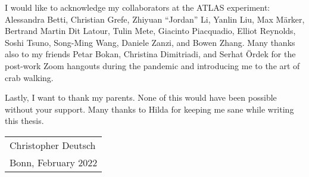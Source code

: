 I would like to acknowledge my collaborators at the ATLAS experiment: Alessandra
Betti, Christian Grefe, Zhiyuan ``Jordan'' Li, Yanlin Liu, Max Märker, Bertrand
Martin Dit Latour, Tulin Mete, Giacinto Piacquadio, Elliot Reynolds, Soshi
Tsuno, Song-Ming Wang, Daniele Zanzi, and Bowen Zhang. Many thanks also to my
\bbtautau friends Petar Bokan, Christina Dimitriadi, and Serhat Ördek for the
post-work Zoom hangouts during the pandemic and introducing me to the art of
crab walking.

Lastly, I want to thank my parents. None of this would have been possible
without your support. Many thanks to Hilda for keeping me sane while writing
this thesis.

\vfill

\hfill%
\begin{tabular}{l}
  Christopher Deutsch \\
  Bonn, February 2022
\end{tabular}

